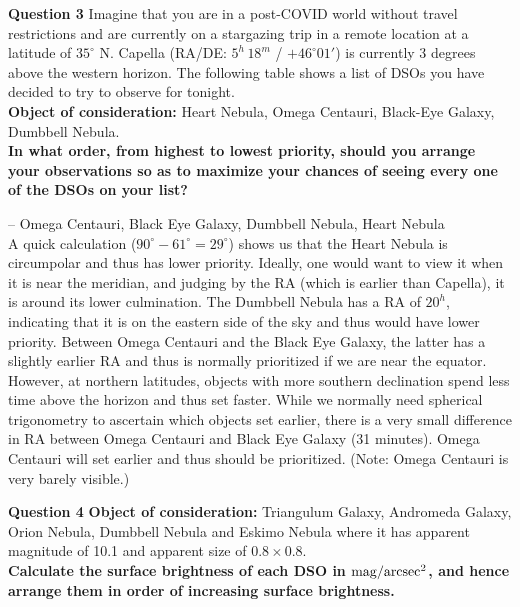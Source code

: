 \documentclass[a4paper,12pt]{extarticle}
\begin{document}
\textsf{\textbf{Question 3}} Imagine that you are in a post-COVID world without travel restrictions and are currently on a stargazing trip in a remote location at a latitude of $35^\circ$ N. Capella (RA/DE: $5^h\, 18^m$ / $+46^\circ 01'$) is currently 3 degrees above the western horizon. The following table shows a list of DSOs you have decided to try to observe for tonight. \\

\textbf{Object of consideration:} Heart Nebula, Omega Centauri, Black-Eye Galaxy, Dumbbell Nebula. \\

\textbf{In what order, from highest to lowest priority, should you arrange your observations so as to maximize your chances of seeing every one of the DSOs on your list?}

\begin{sol}
    -- Omega Centauri, Black Eye Galaxy, Dumbbell Nebula, Heart Nebula\\
    
    A quick calculation ($90^\circ-61^\circ= 29^\circ$) shows us that the Heart Nebula is circumpolar and thus has lower priority. Ideally, one would want to view it when it is near the meridian, and judging by the RA (which is earlier than Capella), it is around its lower culmination. The Dumbbell Nebula has a RA of $20^h$, indicating that it is on the eastern side of the sky and thus would have lower priority. Between Omega Centauri and the Black Eye Galaxy, the latter has a slightly earlier RA and thus is normally prioritized if we are near the equator. However, at northern latitudes, objects with more southern declination spend less time above the horizon and thus set faster. While we normally need spherical trigonometry to ascertain which objects set earlier, there is a very small difference in RA between Omega Centauri and Black Eye Galaxy (31 minutes). Omega Centauri will set earlier and thus should be prioritized. (Note: Omega Centauri is very barely visible.)
\end{sol}
 
 
\textsf{\textbf{Question 4}} \textbf{Object of consideration:} Triangulum Galaxy, Andromeda Galaxy, Orion Nebula, Dumbbell Nebula and Eskimo Nebula where it has apparent magnitude of 10.1 and apparent size of $0.8\times 0.8$. \\ 

\textbf{Calculate the surface brightness of each DSO in $\rm  mag/arcsec^2$, and hence arrange them in order of increasing surface brightness.} 
\end{document}
